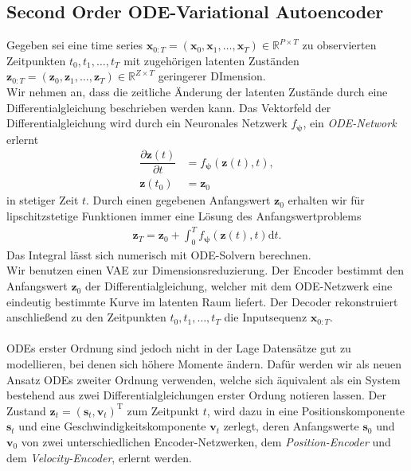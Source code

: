 \documentclass[12pt]{article}
\begin{document}
	\subsection[ODE$^2$-VAE]{Second Order ODE-Variational Autoencoder}
	Gegeben sei eine time series $\mathbf{x}_{0:T}=(\mathbf x_{0}, \mathbf x_{1}, \ldots,\mathbf x_{T})\in \mathbb{R}^{P\times T}$ zu observierten Zeitpunkten $t_{0}, t_{1},\ldots,t_{T}$ mit zugehörigen latenten Zuständen $\mathbf z_{0:T}=(\mathbf z_{0}, \mathbf z_{1}, \ldots, \mathbf z_{T})\in \mathbb{R}^{Z\times T}$ geringerer DImension. \\
	Wir nehmen an, dass die zeitliche Änderung der latenten Zustände durch eine Differentialgleichung beschrieben werden kann. Das Vektorfeld der Differentialgleichung wird durch ein Neuronales Netzwerk $f_{\boldsymbol{\psi}}$, ein \emph{ODE-Network} erlernt
	\begin{align*}
	\dfrac{\partial \mathbf{z}(t)}{\partial t}&=f_{\boldsymbol{\psi}}(\mathbf{z}(t),t), \\
	\mathbf z(t_{0})&=\mathbf z_{0}
	\end{align*}
	in stetiger Zeit $t$. Durch einen gegebenen Anfangswert $\mathbf z_{0}$ erhalten wir für lipschitzstetige Funktionen immer eine Lösung des Anfangswertproblems
	\begin{align*}
	\mathbf z_{T}=\mathbf z_{0} +\int_{0}^{T} f_{\boldsymbol{\psi}}(\mathbf{z}(t),t) \mathrm{d}t.
	\end{align*}
	Das Integral lässt sich numerisch mit ODE-Solvern berechnen. \\
	Wir benutzen einen VAE zur Dimensionsreduzierung. Der Encoder bestimmt den Anfangswert $\mathbf z_{0}$ der Differentialgleichung, welcher mit dem ODE-Netzwerk eine eindeutig bestimmte Kurve im latenten Raum liefert. Der Decoder rekonstruiert anschließend zu den Zeitpunkten $t_{0}, t_{1},\ldots,t_{T}$ die Inputsequenz $\mathbf x_{0:T}$. \\ \\
	ODEs erster Ordnung sind jedoch nicht in der Lage Datensätze gut zu modellieren, bei denen sich höhere Momente ändern. Dafür werden wir als neuen Ansatz ODEs zweiter Ordnung verwenden, welche sich äquivalent als ein System bestehend aus zwei Differentialgleichungen erster Ordung notieren lassen. Der Zustand $\mathbf z_{t}=(\mathbf s_{t}, \mathbf v_{t})^{\mathrm{T}}$ zum Zeitpunkt $t$, wird dazu in eine Positionskomponente $\mathbf s_{t}$ und eine Geschwindigkeitskomponente $\mathbf v_{t}$ zerlegt, deren Anfangswerte $\mathbf s_{0}$ und $\mathbf v_{0}$ von zwei unterschiedlichen Encoder-Netzwerken, dem \emph{Position-Encoder} und dem \emph{Velocity-Encoder}, erlernt werden.
\end{document}
